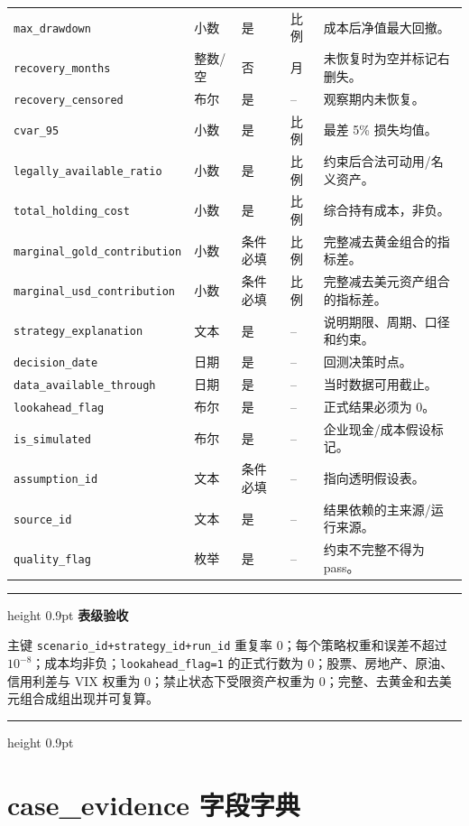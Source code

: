 \documentclass[UTF8,fontset=windows,12pt,openany]{ctexbook}
\newenvironment{gatebox}[1][]{%
  \par\medskip\noindent\begin{center}\begin{minipage}{0.93\textwidth}%
  \color{GoldLine}\hrule height 0.9pt\vspace{0.45em}%
  \textbf{#1}\par\smallskip\color{black}%
}{%
  \par\vspace{0.35em}\color{GoldLine}\hrule height 0.9pt%
  \end{minipage}\end{center}\medskip%
}
\newcommand{\Field}[1]{{\small\nolinkurl{#1}}}
\begin{document}
\begin{landscape}
\begin{longtable}{p{4.0cm}p{2.2cm}p{2.2cm}p{2.5cm}p{7.4cm}}
\Field{max_drawdown} & 小数 & 是 & 比例 & 成本后净值最大回撤。\\
\Field{recovery_months} & 整数/空 & 否 & 月 & 未恢复时为空并标记右删失。\\
\Field{recovery_censored} & 布尔 & 是 & -- & 观察期内未恢复。\\
\Field{cvar_95} & 小数 & 是 & 比例 & 最差 5\% 损失均值。\\
\Field{legally_available_ratio} & 小数 & 是 & 比例 & 约束后合法可动用/名义资产。\\
\Field{total_holding_cost} & 小数 & 是 & 比例 & 综合持有成本，非负。\\
\Field{marginal_gold_contribution} & 小数 & 条件必填 & 比例 & 完整减去黄金组合的指标差。\\
\Field{marginal_usd_contribution} & 小数 & 条件必填 & 比例 & 完整减去美元资产组合的指标差。\\
\Field{strategy_explanation} & 文本 & 是 & -- & 说明期限、周期、口径和约束。\\
\Field{decision_date} & 日期 & 是 & -- & 回测决策时点。\\
\Field{data_available_through} & 日期 & 是 & -- & 当时数据可用截止。\\
\Field{lookahead_flag} & 布尔 & 是 & -- & 正式结果必须为 0。\\
\Field{is_simulated} & 布尔 & 是 & -- & 企业现金/成本假设标记。\\
\Field{assumption_id} & 文本 & 条件必填 & -- & 指向透明假设表。\\
\Field{source_id} & 文本 & 是 & -- & 结果依赖的主来源/运行来源。\\
\Field{quality_flag} & 枚举 & 是 & -- & 约束不完整不得为 pass。\\
\bottomrule
\end{longtable}
\end{landscape}

\begin{gatebox}[表级验收]
主键 \Field{scenario_id+strategy_id+run_id} 重复率 0；每个策略权重和误差不超过 \(10^{-8}\)；成本均非负；\Field{lookahead_flag=1} 的正式行数为 0；股票、房地产、原油、信用利差与 VIX 权重为 0；禁止状态下受限资产权重为 0；完整、去黄金和去美元组合成组出现并可复算。
\end{gatebox}

\chapter{case\_evidence 字段字典}
\end{document}
